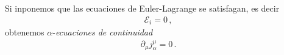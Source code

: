 Si inponemos que las ecuaciones de Euler-Lagrange se satisfagan, es decir
\begin{align}
  \mathcal{E}_i=0\,,
\end{align}
obtenemos $\alpha$-\emph{ecuaciones de continuidad}
\begin{align}
  \partial_{\mu} j^{\mu}_{\alpha}=0\,.
\end{align}






